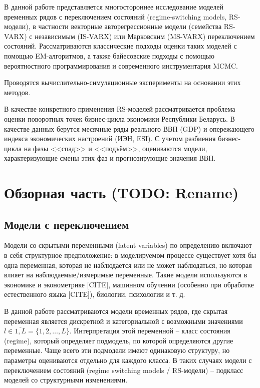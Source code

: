 \documentclass[a4paper,14pt]{extreport}
\begin{document}
В данной работе представляется многостороннее исследование моделей временных рядов с переключением состояний (regime-switching models, RS-модели), в частности векторные авторегрессионные модели (семейства RS-VARX) с независимым (IS-VARX) или Марковским (MS-VARX) переключением состояний. Рассматриваются классические подходы оценки таких моделей с помощью EM-алгоритмов, а также байесовские подходы с помощью вероятностного программирования и современного инструментария MCMC.

Проводятся вычислительно-симуляционные эксперименты на основании этих методов. %

В качестве конкретного применения RS-моделей рассматривается проблема оценки поворотных точек бизнес-цикла экономики Республики Беларусь. В качестве данных берутся месячные ряды реального ВВП (GDP) и опережающего индекса экономических настроений (ИЭН, ESI). С учетом разбиения бизнес-цикла на фазы <<спад>> и <<подъём>>, оцениваются модели, характеризующие смены этих фаз и прогнозирующие значения ВВП.


\chapter{Обзорная часть (TODO: Rename)}


\section{Модели с переключением}

Модели со скрытыми переменными (latent variables) по определению включают в себя структурное предположение: в моделируемом процессе существует хотя бы одна переменная, которая не наблюдается или не может наблюдаться, но которая влияет на наблюдаемые/измеримые переменные. Такие модели используются в экономике и эконометрике [CITE], машинном обучении (особенно при обработке естественного языка [CITE]), биологии, психологии и т. д.

В данной работе рассматриваются модели временных рядов, где скрытая переменная является дискретной и категориальной с возможными значениями $l \in \overline{1,L} = \{1,2,\dots,L\}$. Интерпретация этой переменной -- класс состояния (regime), который определяет подмодель, по которой определяются другие переменные. Чаще всего эти подмодели имеют одинаковую структуру, но параметры оцениваются отдельно для каждого класса. В таких случаях модели с переключением состояний (regime switching models / RS-модели) – подкласс моделей со структурными изменениями.
\end{document}
